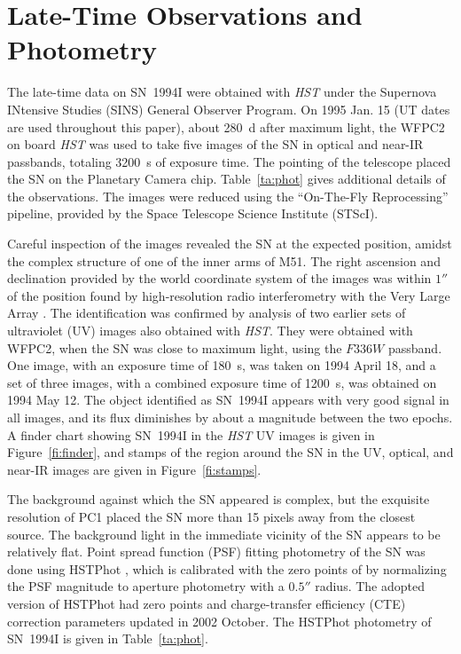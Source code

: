 \documentclass[12pt,manuscript]{aastex}
\begin{document}
\section{Late-Time Observations and Photometry} \label{se:observations}

The late-time data on SN~1994I were obtained with {\em HST} under 
the Supernova INtensive Studies (SINS) General Observer Program.
%
On 1995 Jan. 15 (UT dates are used throughout this paper), about 280~d 
after maximum light, the WFPC2 on board {\em HST} was used to take 
five images of the SN in optical and near-IR passbands,
totaling 3200~s of exposure time.
%
The pointing of the telescope placed the SN on the Planetary 
Camera chip.
%
Table~\ref{ta:phot} gives additional details of the observations.
%
The images were reduced using the ``On-The-Fly Reprocessing'' pipeline,
provided by the Space Telescope Science Institute (STScI).


Careful inspection of the images revealed the SN at the expected 
position, amidst the complex structure of one of the inner arms of M51.
%
The right ascension and declination provided by the world coordinate 
system of the images was within $1''$ of the position found by 
high-resolution radio interferometry with the Very Large
Array \citep{retal94b}.
%
The identification was confirmed by analysis of two earlier 
sets of ultraviolet (UV) images also obtained with {\em HST}.
%
They were obtained with WFPC2, when the SN was close to maximum light,
using the $F336W$ passband.
%
One image, with an exposure time of 180~s, was taken on 1994 April 18, 
and a set of three images, with a combined exposure time of 1200~s,
was obtained on 1994 May 12.
%
The object identified as SN~1994I appears with very good signal 
in all images, and its flux diminishes by about a magnitude 
between the two epochs.
%
A finder chart showing SN~1994I in the {\em HST} UV images is given
in Figure~\ref{fi:finder}, and stamps of the region around the 
SN in the UV, optical, and near-IR images are given in 
Figure~\ref{fi:stamps}.

The background against which the SN appeared is complex, but the 
exquisite resolution of PC1 placed the SN more than 15 pixels 
away from the closest source.
%
The background light in the immediate vicinity of the SN appears 
to be relatively flat.
%
Point spread function (PSF) fitting photometry of the SN
was done using HSTPhot \citep{dol00},
which is calibrated with the zero points of \citet{hol95}
by normalizing the PSF magnitude to aperture photometry with 
a $0.5''$ radius.
%
The adopted version of HSTPhot had zero points and charge-transfer
efficiency (CTE) correction parameters updated in 2002 October.
%
The HSTPhot photometry of SN~1994I is given in Table~\ref{ta:phot}.
\end{document}
